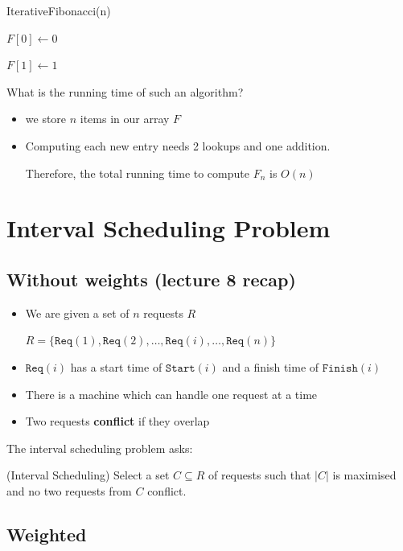 \documentclass{article}
\begin{document}
\begin{algorithm}
  \caption{IterativeFibonacci(n)}
  $F[0] \leftarrow 0$

  $F[1] \leftarrow 1$

\end{algorithm}

What is the running time of such an algorithm?

\begin{itemize}
  \item we store $n$ items in our array $F$
  \item Computing each new entry needs 2 lookups and one addition.

        Therefore, the total running time to compute $F_{n}$ is $O(n)$
\end{itemize}

\section{Interval Scheduling Problem}

\subsection{Without weights (lecture 8 recap)}

\begin{itemize}
  \item We are given a set of $n$ requests $R$ 

    $R = \{ \texttt{Req}(1), \texttt{Req}(2), \ldots, \texttt{Req}(i), \ldots, \texttt{Req}(n)\} $
  \item $\texttt{Req}(i)$ has a start time of $\texttt{Start} (i)$ and a finish time of $\texttt{Finish} (i)$
  \item There is a machine which can handle one request at a time
  \item Two requests \textbf{conflict} if they overlap
\end{itemize}

The interval scheduling problem asks:

\begin{problem}(Interval Scheduling)
 Select a set $C \subseteq R$ of requests such that $|C|$ is maximised and no two requests from $C$ conflict.
\end{problem}

\subsection{Weighted}
\end{document}
